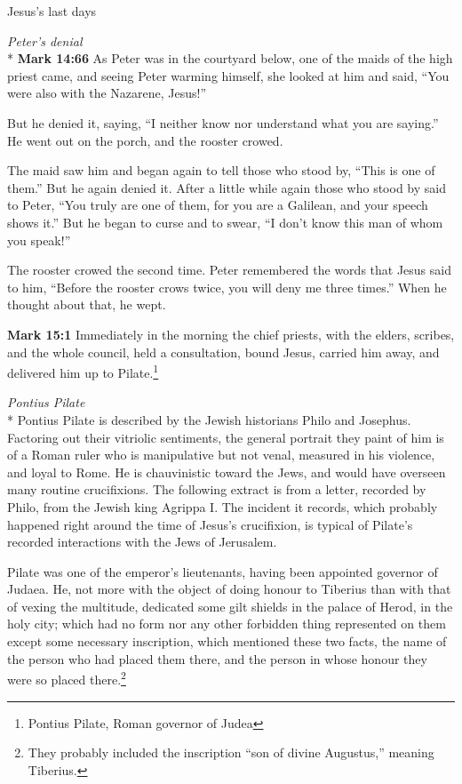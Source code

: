 \documentclass[10pt,twoside]{article} %
\newcommand{\doimage}[2]{\texttt{[image: \#2]}\label{fig:#2}}
\newcommand{\figbasic}[4]{ %
    \ifthenelse{\isodd{\pageref{fig:#2}}}{}{\hfill}
    \ifstrempty{#3}{
      \doimage{#1}{#2}
    }{
      \makebox{\doimage{#1}{#2} \\ #3}
    }
    \ifthenelse{\isodd{\pageref{fig:#2}}}{\hfill}{}
    \par
}
\newcommand{\fig}[2][0.4]{
  \figbasic{#1}{#2}{}{}
}
\newcommand{\quotesize}{\normalsize{}}
\newcommand{\comm}[1]{\begingroup \color{black!50} #1\endgroup}
\newenvironment{quotetext}{\begingroup\quotesize}{\endgroup}
\newcommand{\intex}[1]{\index[texts]{#1}}
\newcommand{\bible}[2]{\begin{quotetext}\textbf{#1}\intex{#1} #2\end{quotetext}}
\newcommand{\gospelmark}[2]{\bible{Mark #1}{#2}}
\newcommand{\subhead}[1]{\emph{#1}\\*}
\begin{document}
\begin{section}{Jesus's last days}
\fig{denial-of-saint-peter}

\subhead{Peter's denial}
\gospelmark{14:66}{
  As Peter was in the courtyard below, one of the maids of the high priest came,   and seeing Peter warming himself, she looked at him and said, ``You were also with the Nazarene, Jesus!''

  But he denied it, saying, ``I neither know nor understand what you are saying.'' He went out on the porch, and the rooster crowed.

  The maid saw him and began again to tell those who stood by, ``This is one of them.''   But he again denied it. After a little while again those who stood by said to Peter, ``You truly are one of them, for you are a Galilean, and your speech shows it.''\label{peter-accent}
   But he began to curse and to swear, ``I don't know this man of whom you speak!''

  The rooster crowed the second time. Peter remembered the words that Jesus said to him, ``Before the rooster crows twice, you will deny me three times.'' When he thought about that, he wept. 
}

\gospelmark{15:1}{
Immediately in the morning the chief priests, with the elders, scribes, and the whole council, held a consultation, bound Jesus, carried him away, and delivered him up to Pilate.\index{Pilate}\footnote{Pontius Pilate, Roman governor of Judea}
}

\subhead{Pontius Pilate}
\comm{Pontius Pilate is described by the Jewish  historians Philo and Josephus. Factoring out their vitriolic sentiments,
the general portrait they paint of him is
of a Roman ruler who is manipulative but not venal, measured in his violence, and loyal to Rome.
He is chauvinistic toward the Jews, and would have overseen many routine crucifixions. The following extract is
from a letter, recorded by Philo, from the Jewish king Agrippa I. The incident it records, which probably happened right around
the time of Jesus's crucifixion, is typical
of Pilate's recorded interactions with the Jews of Jerusalem.}

\begin{quotetext}
Pilate was one of the emperor's lieutenants, having been appointed
governor of Judaea. He, not more with the object of doing honour to
Tiberius than with that of vexing the multitude, dedicated some gilt
shields in the palace of Herod, in the holy city; which had no form
nor any other forbidden thing represented on them except some
necessary inscription, which mentioned these two facts, the name of
the person who had placed them there, and the person in whose honour
they were so placed there.\footnote{They probably included the inscription ``son of divine Augustus,'' meaning Tiberius.} 


\end{quotetext}
\end{section}
\end{document}
